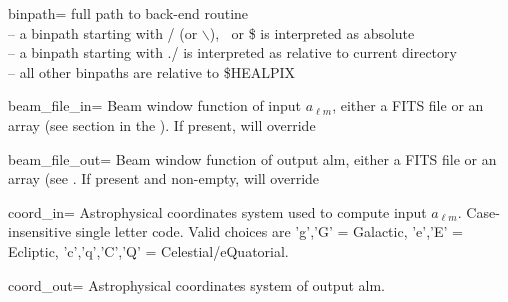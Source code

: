 \begin{keywords}
  \begin{kwlist}{} %

 \item[binpath=]  full path to back-end routine \\
              -- a binpath starting with / (or $\backslash$), $~$ or \$ is interpreted as absolute\\
              -- a binpath starting with ./ is interpreted as relative to current directory\\
              -- all other binpaths are relative to \$HEALPIX

 \item[beam\_file\_in=] Beam window function of input $a_{\ell m}$,
                 either a FITS file or an array 
		(see  section
		in the ). 
		If present, will override

 \item[beam\_file\_out=]  Beam window function of output alm, 
                 either a FITS file or an array (see . 
		If present and non-empty, will override

 \item[coord\_in=]      Astrophysical coordinates system used to compute input $a_{\ell m}$.
                 Case-insensitive single letter code.
                 Valid choices are 'g','G' = Galactic, 'e','E' = Ecliptic,
                 'c','q','C','Q' = Celestial/eQuatorial.

 \item[coord\_out=]     Astrophysical coordinates system of output alm.


\end{kwlist}
\end{keywords}

